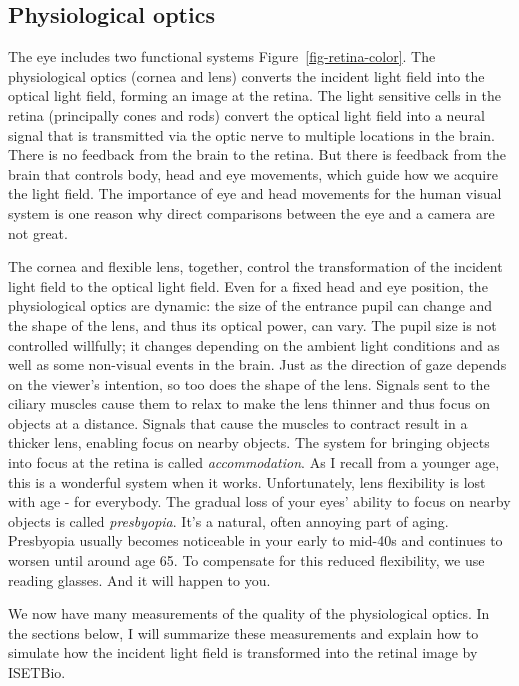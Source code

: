 \documentclass[
  letterpaper,
]{book}
\begin{document}
\subsection{Physiological optics}\label{physiological-optics}

The eye includes two functional systems Figure~\ref{fig-retina-color}.
The physiological optics (cornea and lens) converts the incident light
field into the optical light field, forming an image at the retina. The
light sensitive cells in the retina (principally cones and rods) convert
the optical light field into a neural signal that is transmitted via the
optic nerve to multiple locations in the brain. There is no feedback
from the brain to the retina. But there is feedback from the brain that
controls body, head and eye movements, which guide how we acquire the
light field. The importance of eye and head movements for the human
visual system is one reason why direct comparisons between the eye and a
camera are not great.

The cornea and flexible lens, together, control the transformation of
the incident light field to the optical light field. Even for a fixed
head and eye position, the physiological optics are dynamic: the size of
the entrance pupil can change and the shape of the lens, and thus its
optical power, can vary. The pupil size is not controlled willfully; it
changes depending on the ambient light conditions and as well as some
non-visual events in the brain. Just as the direction of gaze depends on
the viewer's intention, so too does the shape of the lens. Signals sent
to the ciliary muscles cause them to relax to make the lens thinner and
thus focus on objects at a distance. Signals that cause the muscles to
contract result in a thicker lens, enabling focus on nearby objects. The
system for bringing objects into focus at the retina is called
\emph{accommodation}. As I recall from a younger age, this is a
wonderful system when it works. Unfortunately, lens flexibility is lost
with age - for everybody. The gradual loss of your eyes' ability to
focus on nearby objects is called \emph{presbyopia}. It's a natural,
often annoying part of aging. Presbyopia usually becomes noticeable in
your early to mid-40s and continues to worsen until around age 65. To
compensate for this reduced flexibility, we use reading glasses. And it
will happen to you.

We now have many measurements of the quality of the physiological
optics. In the sections below, I will summarize these measurements and
explain how to simulate how the incident light field is transformed into
the retinal image by ISETBio.
\end{document}
